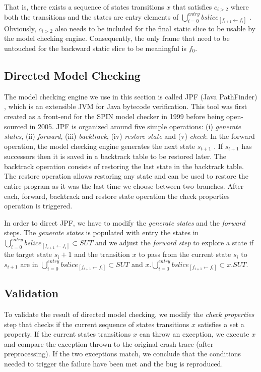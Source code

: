 That is, there exists a sequence of states transitions $x$ that
satisfies $c_{i>2}$ where both the transitions and the states are
entry
elements of $\bigcup_{i=0}^{entry} bslice_{[f_{i+1} \leftarrow f_i]}$ . Obviously, $c_{i>2}$ also
needs to be included for the final static slice to be usable by
the model checking engine. Consequently, the only frame that
need to be untouched for the backward static slice to be
meaningful is $f_0$.

\subsection{Directed Model Checking}

The model checking engine we use in this section is called JPF
(Java PathFinder) \cite{Visser2004}, which is an extensible JVM for Java
bytecode verification. This tool was first created as a front-end
for the SPIN model checker \cite{holzmann1997model} in 1999 before being open-
sourced in 2005. JPF is organized around five simple
operations: (i) {\it generate states}, (ii) {\it forward}, (iii) {\it backtrack},
(iv) {\it restore state} and (v) {\it check}. In the forward operation, the
model checking engine generates the next state $s_{t+1}$ . If
$s_{t+1}$ has successors then it is saved in a backtrack table to be
restored later. The backtrack operation consists of restoring
the last state in the backtrack table. The restore operation
allows restoring any state and can be used to restore the entire
program as it was the last time we choose between two
branches. After each, forward, backtrack and restore state
operation the check properties operation is triggered.

In order to direct JPF, we have to modify the {\it generate states}
and the {\it forward} steps. The {\it generate states} is populated with
entry
the states in $\bigcup_{i=0}^{entry} bslice_{[f_{i+1} \leftarrow f_i]}  \subset SUT$ and we adjust the
{\it forward step} to explore a state if the target state $s_i+1$ and the
transition $x$ to pass from the current state $s_i$ to $s_{i+1}$ are in
$\bigcup_{i=0}^{entry} bslice_{[f_{i+1} \leftarrow f_i]}  \subset SUT$ and $x.\bigcup_{i=0}^{entry} bslice_{[f_{i+1} \leftarrow f_i]}  \subset x.SUT$.

\subsection{Validation}

To validate the result of directed model checking, we modify
the {\it check properties} step that checks if the current sequence
of states transitions $x$ satisfies a set a property. If the current
states transitions $x$ can throw an exception, we execute $x$ and
compare the exception thrown to the original crash trace (after
preprocessing). If the two exceptions match, we conclude that
the conditions needed to trigger the failure have been met and
the bug is reproduced.


